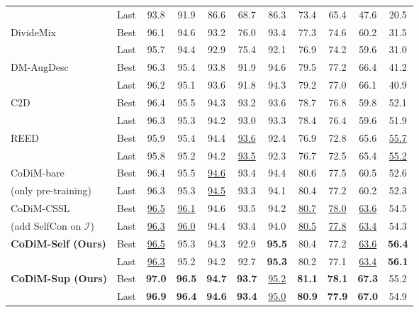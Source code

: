 \documentclass[letterpaper]{article} \usepackage{aaai22}  \usepackage{times}  \usepackage{helvet}  \usepackage{courier}  \usepackage[hyphens]{url}  \usepackage{graphicx} \usepackage{subfigure}
\begin{document}
\begin{table*}[h]
\begin{center}
\begin{tabular}{lcccccccccc}
 & Last & 93.8 & 91.9 & 86.6 & 68.7 & 86.3 & 73.4 & 65.4 & 47.6 & 20.5 \\
\multirow{2}{*}{DivideMix \cite{li2020dividemix}} & Best & 96.1 & 94.6 & 93.2 & 76.0 & 93.4 & 77.3 & 74.6 & 60.2 & 31.5 \\
 & Last & 95.7 & 94.4 & 92.9 & 75.4 & 92.1 & 76.9 & 74.2 & 59.6 & 31.0 \\
\multirow{2}{*}{DM-AugDesc \cite{nishi2021augmentation}} & Best & 96.3 & 95.4 & 93.8 & 91.9 & 94.6 & 79.5 & 77.2 & 66.4 & 41.2 \\
 & Last & 96.2 & 95.1 & 93.6 & 91.8 & 94.3 & 79.2 & 77.0 & 66.1 & 40.9 \\
\multirow{2}{*}{C2D\cite{zheltonozhskii2021contrast} } & Best & 96.4 & 95.5 & 94.3 & 93.2 & 93.6 & 78.7 & 76.8 & 59.8 & 52.1 \\
 & Last & 96.3 & 95.3 & 94.2 & 93.0 & 93.3 & 78.4 & 76.4 & 59.6 & 51.9 \\
\multirow{2}{*}{REED \cite{zhang2020decoupling}} & Best & 95.9 & 95.4 & 94.4 & \underline{93.6} & 92.4 & 76.9 & 72.8 & 65.6 & \underline{55.7} \\
 & Last & 95.8 & 95.2 & 94.2 & \underline{93.5} & 92.3 & 76.7 & 72.5 & 65.4 &  \underline{55.2} \\
\hline
\hline
CoDiM-bare & Best & 96.4 & 95.5 & \underline{94.6} & 93.4 & 94.4 & 80.6 & 77.5 & 60.5 & 52.6 \\
(only pre-training) & Last & 96.3 & 95.3 & \underline{94.5} & 93.3 & 94.1 & 80.4 & 77.2 & 60.2 & 52.3 \\
\hline
CoDiM-CSSL & Best & \underline{96.5} & \underline{96.1} & 94.6 & 93.5 & 94.2 & \underline{80.7} & \underline{78.0} & \underline{63.6} & 54.5 \\
(add SelfCon on $\mathcal{I}$)& Last & \underline{96.3} & \underline{96.0} & 94.4 & 93.4 & 94.0 & \underline{80.5} & \underline{77.8} & \underline{63.4} & 54.3 \\
\hline
\multirow{2}{*}{\textbf{CoDiM-Self (Ours)}} & Best & \underline{96.5} & 95.3 & 94.3 & 92.9 & \textbf{95.5} & 80.4 & 77.2 & \underline{63.6} & \textbf{56.4} \\
& Last & \underline{96.3} & 95.2 & 94.2 & 92.7 & \textbf{95.3} & 80.2 & 77.1 & \underline{63.4} & \textbf{56.1} \\
\hline
\multirow{2}{*}{\textbf{CoDiM-Sup (Ours)}} & Best & \textbf{97.0} & \textbf{96.5} & \textbf{94.7} & \textbf{93.7} & \underline{95.2} & \textbf{81.1} & \textbf{78.1} & \textbf{67.3} & 55.2 \\
 & Last & \textbf{96.9} & \textbf{96.4} & \textbf{94.6} & \textbf{93.4} & \underline{95.0} & \textbf{80.9} & \textbf{77.9} & \textbf{67.0} & 54.9 \\

\end{tabular}
\end{center}
\end{table*}
\end{document}
